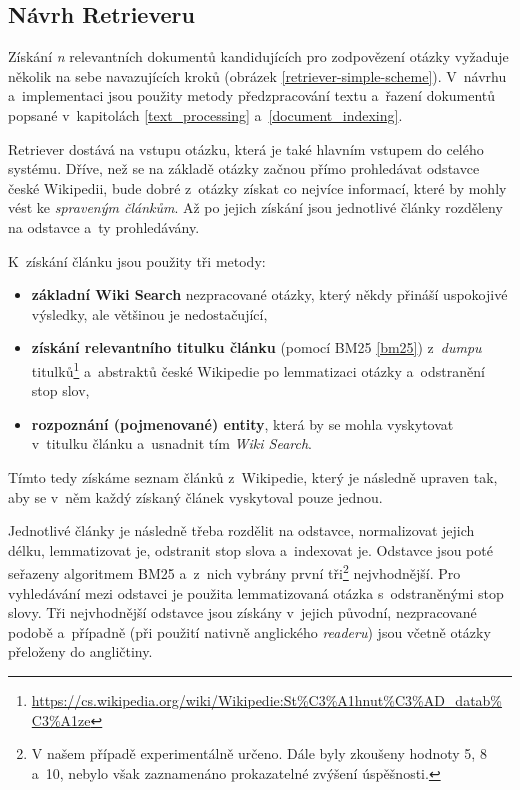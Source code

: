 \subsection{Návrh Retrieveru}
Získání \emph{n} relevantních dokumentů kandidujících pro zodpovězení otázky vyžaduje několik na sebe navazujících kroků (obrázek \ref{retriever-simple-scheme}). V~návrhu a~implementaci jsou použity metody předzpracování textu a~řazení dokumentů popsané v~kapitolách \ref{text_processing} a~\ref{document_indexing}.\par
Retriever dostává na vstupu otázku, která je také hlavním vstupem do celého systému. Dříve, než se na základě otázky začnou přímo prohledávat odstavce české Wikipedii, bude dobré z~otázky získat co nejvíce informací, které by mohly vést ke \emph{spraveným článkům}. Až po jejich získání jsou jednotlivé články rozděleny na odstavce a~ty prohledávány.\par
\noindent K~získání článku jsou použity tři metody:
\begin{itemize}
    \item \textbf{základní Wiki Search} nezpracované otázky, který někdy přináší uspokojivé výsledky, ale většinou je nedostačující,
    \item \textbf{získání relevantního titulku článku} (pomocí BM25 \ref{bm25}) z~\emph{dumpu} titulků\footnote{\url{https://cs.wikipedia.org/wiki/Wikipedie:St\%C3\%A1hnut\%C3\%AD_datab\%C3\%A1ze}} a~abstraktů české Wikipedie po lemmatizaci otázky a~odstranění stop slov,
    \item \textbf{rozpoznání (pojmenované) entity}, která by se mohla vyskytovat v~titulku článku a~usnadnit tím \emph{Wiki Search}.
\end{itemize}
Tímto tedy získáme seznam článků z~Wikipedie, který je následně upraven tak, aby se v~něm každý získaný článek vyskytoval pouze jednou.\par
Jednotlivé články je následně třeba rozdělit na odstavce, normalizovat jejich délku, lemmatizovat je, odstranit stop slova a~indexovat je. Odstavce jsou poté seřazeny algoritmem BM25 a~z~nich vybrány první tři\footnote{V našem případě experimentálně určeno. Dále byly zkoušeny hodnoty 5, 8 a~10, nebylo však zaznamenáno prokazatelné zvýšení úspěšnosti.} nejvhodnější. Pro vyhledávání mezi odstavci je použita lemmatizovaná otázka s~odstraněnými stop slovy. Tři nejvhodnější odstavce jsou získány v~jejich původní, nezpracované podobě a~případně (při použití nativně anglického \emph{readeru}) jsou včetně otázky přeloženy do angličtiny.


